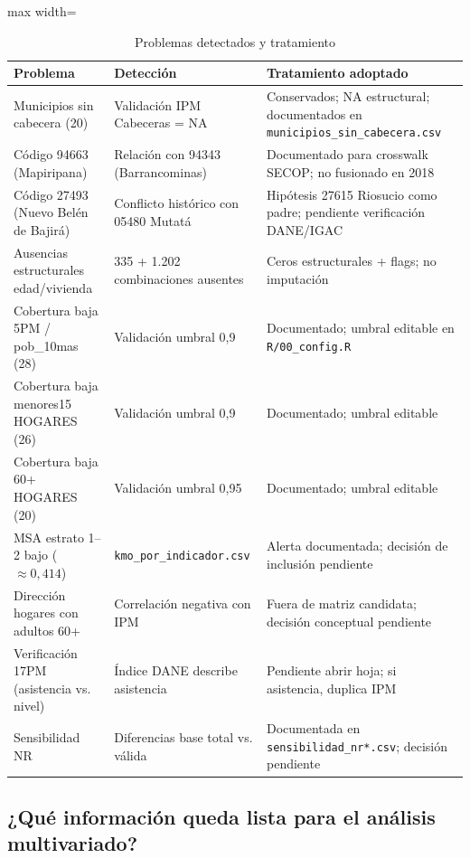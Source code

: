 \begin{table}[htbp]
\centering
\caption{Problemas detectados y tratamiento}
\label{tab:problemas_detectados}
\begin{adjustbox}{max width=\textwidth}
\begin{tabular}{@{}lll@{}}
\toprule
\textbf{Problema} & \textbf{Detección} & \textbf{Tratamiento adoptado} \\
\midrule
Municipios sin cabecera (20) & Validación IPM Cabeceras = NA & Conservados; NA estructural; documentados en \texttt{municipios\_sin\_cabecera.csv} \\
Código 94663 (Mapiripana) & Relación con 94343 (Barrancominas) & Documentado para crosswalk SECOP; no fusionado en 2018 \\
Código 27493 (Nuevo Belén de Bajirá) & Conflicto histórico con 05480 Mutatá & Hipótesis 27615 Riosucio como padre; pendiente verificación DANE/IGAC \\
Ausencias estructurales edad/vivienda & 335 + 1.202 combinaciones ausentes & Ceros estructurales + flags; no imputación \\
Cobertura baja 5PM / pob\_10mas (28) & Validación umbral 0,9 & Documentado; umbral editable en \texttt{R/00\_config.R} \\
Cobertura baja menores15 HOGARES (26) & Validación umbral 0,9 & Documentado; umbral editable \\
Cobertura baja 60+ HOGARES (20) & Validación umbral 0,95 & Documentado; umbral editable \\
MSA estrato 1--2 bajo ($\approx 0,414$) & \texttt{kmo\_por\_indicador.csv} & Alerta documentada; decisión de inclusión pendiente \\
Dirección hogares con adultos 60+ & Correlación negativa con IPM & Fuera de matriz candidata; decisión conceptual pendiente \\
Verificación 17PM (asistencia vs. nivel) & Índice DANE describe asistencia & Pendiente abrir hoja; si asistencia, duplica IPM \\
Sensibilidad NR & Diferencias base total vs. válida & Documentada en \texttt{sensibilidad\_nr*.csv}; decisión pendiente \\
\bottomrule
\end{tabular}
\end{adjustbox}
\end{table}

\subsection{¿Qué información queda lista para el análisis multivariado?}

